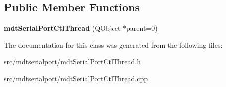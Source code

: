 \subsection*{Public Member Functions}
\begin{DoxyCompactItemize}
\item 
\hypertarget{classmdt_serial_port_ctl_thread_a326a83376c644e8d43224422a6ed4735}{
{\bfseries mdtSerialPortCtlThread} (QObject $\ast$parent=0)}
\label{classmdt_serial_port_ctl_thread_a326a83376c644e8d43224422a6ed4735}

\end{DoxyCompactItemize}


The documentation for this class was generated from the following files:\begin{DoxyCompactItemize}
\item 
src/mdtserialport/mdtSerialPortCtlThread.h\item 
src/mdtserialport/mdtSerialPortCtlThread.cpp\end{DoxyCompactItemize}
